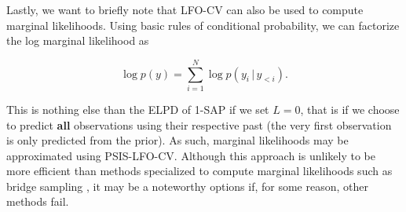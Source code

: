 \documentclass[american,]{article}
\begin{document}
Lastly, we want to briefly note that LFO-CV can also be used to compute marginal
likelihoods. Using basic rules of conditional probability, we can factorize the
log marginal likelihood as

\begin{equation}
\log p(y) = \sum_{i=1}^N \log p(y_i \,|\, y_{<i}).
\end{equation}

This is nothing else than the ELPD of 1-SAP if we set \(L = 0\), that is if we
choose to predict \textbf{all} observations using their respective past (the very
first observation is only predicted from the prior). As such, marginal
likelihoods may be approximated using PSIS-LFO-CV. Although this approach is
unlikely to be more efficient than methods specialized to compute marginal
likelihoods such as bridge sampling \citep{meng1996, meng2002, gronau2017}, it may
be a noteworthy options if, for some reason, other methods fail.

\newpage


\end{document}
